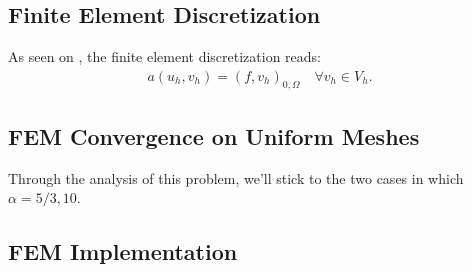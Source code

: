 \subsection{Finite Element Discretization}
As seen on , the finite element discretization reads:
\begin{gather}
	a(u_h, v_h) = (f, v_h)_{0, \Omega} \quad \forall v_h \in V_h.
\end{gather}

\subsection{FEM Convergence on Uniform Meshes}

Through the analysis of this problem, we'll stick to the two cases in which $\alpha = 5/3, 10$.

\subsection{FEM Implementation}